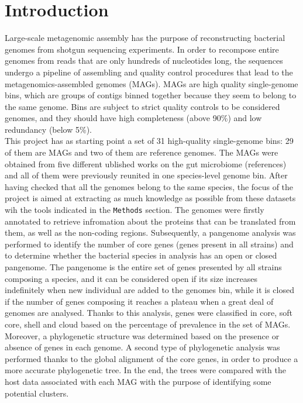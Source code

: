 \section*{Introduction}



Large-scale metagenomic assembly has the purpose of reconstructing bacterial genomes from shotgun sequencing experiments. In order to recompose entire genomes from reads that are only hundreds of nucleotides long, the sequences undergo a pipeline of assembling and quality control procedures that lead to the metagenomics-assembled genomes (MAGs). MAGs are high quality single-genome bins, which are groups of contigs binned together because they seem to belong to the same genome. Bins are subject to strict quality controls to be considered genomes, and they should have high completeness (above 90\%) and low redundancy (below 5\%).\\

This project has as starting point a set of 31 high-quality single-genome bins: 29 of them are MAGs and two of them are reference genomes. The MAGs were obtained from five different ublished works on the gut microbiome (references) and all of them were previously reunited in one species-level genome bin. After having checked that all the genomes belong to the same species, the focus of the project is aimed at extracting as much knowledge as possible from these datasets wih the tools indicated in the \texttt{Methods} section. The genomes were firstly annotated to retrieve infromation about the proteins that can be translated from them, as well as the non-coding regions. Subsequently, a pangenome analysis was performed to identify the number of core genes (genes present in all strains) and to determine whether the bacterial species in analysis has an open or closed pangenome. The pangenome is the entire set of genes presented by all strains composing a species, and it can be considered open if its size increases indefinitely when new individual are added to the genomes bin, while it is closed if the number of genes composing it reaches a plateau when a great deal of genomes are analysed. Thanks to this analysis, genes were classified in core, soft core, shell and cloud based on the percentage of prevalence in the set of MAGs. Moreover, a phylogenetic structure was determined based on the presence or absence of genes in each genome. A second type of phylogenetic analysis was performed thanks to the global alignment of the core genes, in order to produce a more accurate phylogenetic tree. In the end, the trees were compared with the host data associated with each MAG with the purpose of identifying some potential clusters. 
